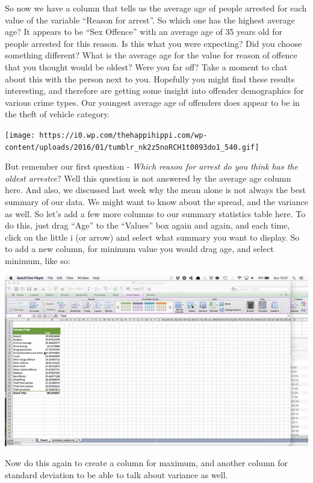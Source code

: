 \documentclass[]{book}
\theoremstyle{definition}
\theoremstyle{definition}
\theoremstyle{definition}
\theoremstyle{remark}
\begin{document}
So now we have a column that tells us the average age of people arrested
for each value of the variable ``Reason for arrest''. So which one has
the highest average age? It appears to be ``Sex Offence'' with an
average age of 35 years old for people arrested for this reason. Is this
what you were expecting? Did you choose something different? What is the
average age for the value for reason of offence that you thought would
be oldest? Were you far off? Take a moment to chat about this with the
person next to you. Hopefully you might find these results interesting,
and therefore are getting some insight into offender demographics for
various crime types. Our youngest average age of offenders does appear
to be in the theft of vehicle category.

\texttt{[image: https://i0.wp.com/thehappihippi.com/wp-content/uploads/2016/01/tumblr\_nk2z5noRCH1t0093do1\_540.gif]}

But remember our first question - \emph{Which reason for arrest do you
think has the oldest arrestee}? Well this question is not answered by
the average age column here. And also, we discussed last week why the
mean alone is not always the best summary of our data. We might want to
know about the spread, and the variance as well. So let's add a few more
columns to our summary statistics table here. To do this, just drag
``Age'' to the ``Values'' box again and again, and each time, click on
the little i (or arrow) and select what summary you want to display. So
to add a new column, for minimum value you would drag age, and select
minimum, like so:

\includegraphics{imgs/make_min_col.gif}

Now do this again to create a column for maximum, and another column for
standard deviation to be able to talk about variance as well.
\end{document}
